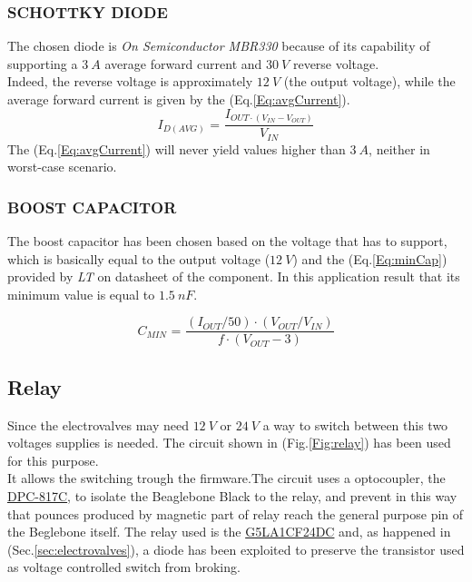 \subsubsection{SCHOTTKY DIODE}
The chosen diode is \textit{On Semiconductor MBR330} because of its capability of supporting a $3\ A$ average forward current and $30\ V$ reverse voltage.\\
Indeed, the reverse voltage is approximately $12\ V$ (the output voltage), while
the average forward current is given by the (Eq.\ref{Eq:avgCurrent}).
\begin{equation}
	I_{D \left(AVG\right)} \text{ = } \frac{I_{OUT \cdot \left(V_{IN} - V_{OUT}\right)}}{V_{IN}}
	\label{Eq:avgCurrent}
\end{equation}
The (Eq.\ref{Eq:avgCurrent}) will never yield values higher than $3\ A$, neither in worst-case scenario.
\subsubsection{BOOST CAPACITOR}
The boost capacitor has been chosen based on the voltage that has to support, which is basically equal to the output voltage ($12\ V$) and the (Eq.\ref{Eq:minCap}) provided by \textit{LT} on datasheet of the component. In this application result that its minimum value is equal to $1.5\ nF$.

\begin{equation}
C_{MIN} \text{ = } \frac{\left(I_{OUT} / 50 \right) \cdot \left( V_{OUT} / V_{IN}\right)}{f \cdot \left(V_{OUT} - 3\right)}
\label{Eq:minCap}
\end{equation} 

\subsection{Relay}

Since the electrovalves may need $12\ V$ or $24\ V$ a way to switch between this two voltages supplies is needed. The circuit shown in (Fig.\ref{Fig:relay}) has been used for this purpose.\\
It allows the switching trough the firmware.The circuit uses a optocoupler, the \href{http://www.keepjump.com.tw/DataSheet/Others/DPC-817C.pdf}{DPC-817C}, to isolate the Beaglebone Black to the relay, and prevent in this way that pounces produced by magnetic part of relay reach the general purpose pin of the Beglebone itself. The relay used is the \href{http://www.rlocman.ru/i/File/dat/Omron/Relays/G5LA145DC.pdf}{G5LA1CF24DC} and, as happened in (Sec.\ref{sec:electrovalves}), a diode has been exploited to preserve the transistor used as voltage controlled switch from broking. 

